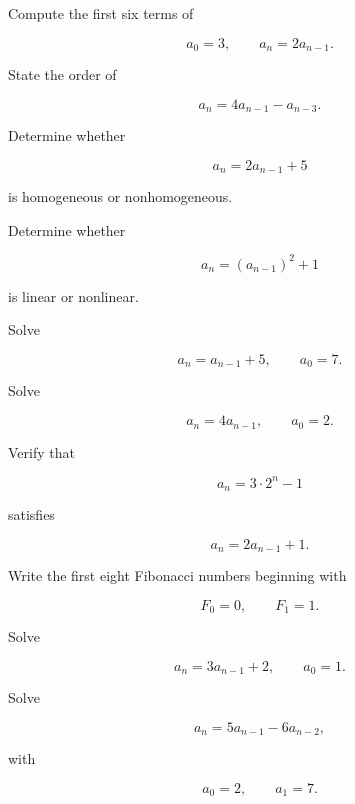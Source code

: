 \begin{exercise}[1]
Compute the first six terms of

\[
a_0=3,
\qquad
a_n=2a_{n-1}.
\]
\end{exercise}

\begin{exercise}[1]
State the order of

\[
a_n=4a_{n-1}-a_{n-3}.
\]
\end{exercise}

\begin{exercise}[1]
Determine whether

\[
a_n=2a_{n-1}+5
\]

is homogeneous or nonhomogeneous.
\end{exercise}

\begin{exercise}[1]
Determine whether

\[
a_n=(a_{n-1})^2+1
\]

is linear or nonlinear.
\end{exercise}

\begin{exercise}[1]
Solve

\[
a_n=a_{n-1}+5,
\qquad
a_0=7.
\]
\end{exercise}

\begin{exercise}[1]
Solve

\[
a_n=4a_{n-1},
\qquad
a_0=2.
\]
\end{exercise}

\begin{exercise}[1]
Verify that

\[
a_n=3\cdot2^n-1
\]

satisfies

\[
a_n=2a_{n-1}+1.
\]
\end{exercise}

\begin{exercise}[1]
Write the first eight Fibonacci numbers beginning with

\[
F_0=0,
\qquad
F_1=1.
\]
\end{exercise}

\begin{exercise}[2]
Solve

\[
a_n=3a_{n-1}+2,
\qquad
a_0=1.
\]
\end{exercise}

\begin{exercise}[2]
Solve

\[
a_n=5a_{n-1}-6a_{n-2},
\]

with

\[
a_0=2,
\qquad
a_1=7.
\]
\end{exercise}

